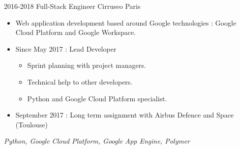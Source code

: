 \cventry
    {2016-2018}
    {Full-Stack Engineer}
    {}
    {Cirruseo}
    {Paris}
    {
        \begin{itemize}
            \item Web application development based around Google technologies : Google Cloud Platform and Google Workspace.
            \item Since May 2017 : Lead Developer
            \begin{itemize}
                \item Sprint planning with project managers.
                \item Technical help to other developers.
                \item Python and Google Cloud Platform specialist.
            \end{itemize}
            \item September 2017 : Long term assignment with Airbus Defence and Space (Toulouse)
        \end{itemize}
        \textit{Python, Google Cloud Platform, Google App Engine, Polymer}
    }
\vspace*{0.2cm}
